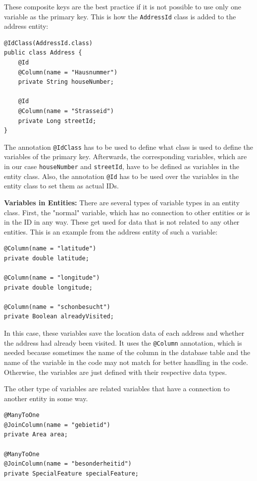     These composite keys are the best practice if it is not possible to use only one variable as the primary key. This is how the \texttt{AddressId} class is added to the address entity: 
    \lstset{style=mycsharp, caption=IDs in Address-Entity}
    \begin{lstlisting}
@IdClass(AddressId.class)
public class Address {
    @Id
    @Column(name = "Hausnummer")
    private String houseNumber;

    @Id
    @Column(name = "Strasseid")
    private Long streetId;
}                         
    \end{lstlisting} 
    The annotation \texttt{@IdClass} has to be used to define what class is used to define the variables of the primary key. Afterwards, the corresponding variables, which are in our case \texttt{houseNumber} and \texttt{streetId}, have to be defined as variables in the entity class. Also, the annotation \texttt{@Id} has to be used over the variables in the entity class to set them as actual IDs. \newline 

    \textbf{Variables in Entities:} \newline
    There are several types of variable types in an entity class. First, the "normal" variable, which has no connection to other entities or is in the ID in any way. These get used for data that is not related to any other entities. This is an example from the address entity of such a variable:
    \lstset{style=mycsharp, caption="Normal" Variable}
    \begin{lstlisting}
@Column(name = "latitude")
private double latitude;
    
@Column(name = "longitude")
private double longitude;
    
@Column(name = "schonbesucht")
private Boolean alreadyVisited;                     
    \end{lstlisting} 
    In this case, these variables save the location data of each address and whether the address had already been visited. It uses the \texttt{@Column} annotation, which is needed because sometimes the name of the column in the database table and the name of the variable in the code may not match for better handling in the code. Otherwise, the variables are just defined with their respective data types. \newline

    The other type of variables are related variables that have a connection to another entity in some way.
    \lstset{style=mycsharp, caption=ManyToOne Variable}
    \begin{lstlisting}
@ManyToOne
@JoinColumn(name = "gebietid")
private Area area;
    
@ManyToOne
@JoinColumn(name = "besonderheitid")
private SpecialFeature specialFeature;                    
    \end{lstlisting} 

